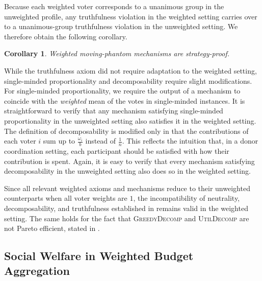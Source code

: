 \documentclass[11pt]{article}
\newcommand{\GrdDec}{\textsc{GreedyDecomp} }
\newcommand{\UtDec}{\textsc{UtilDecomp} }
\newtheorem{corollary}{Corollary}
\begin{document}
Because each weighted voter corresponds to a unanimous group in the unweighted profile, any truthfulness violation in the weighted setting carries over to a unanimous-group truthfulness violation in the unweighted setting. We therefore obtain the following corollary.

\begin{corollary}
    Weighted moving-phantom mechanisms are strategy-proof.
\end{corollary}


While the truthfulness axiom did not require adaptation to the weighted setting, single-minded proportionality and decomposability require slight modifications.
For single-minded proportionality, we require the output of a mechanism to coincide with the \textit{weighted} mean of the votes in single-minded instances. It is straightforward to verify that any mechanism satisfying single-minded proportionality in the unweighted setting also satisfies it in the weighted setting. 
The definition of decomposability is modified only in that the contributions of each voter $i$ sum up to $\frac{\omega_i}{b}$ instead of $\frac{1}{n}$. This reflects the intuition that, in a donor coordination setting, each participant should be satisfied with how their contribution is spent. Again, it is easy to verify that every mechanism satisfying decomposability in the unweighted setting also does so in the weighted setting.

Since all relevant weighted axioms and mechanisms reduce to their unweighted counterparts when all voter weights are $1$, the incompatibility of neutrality, decomposability, and truthfulness established in  remains valid in the weighted setting. The same holds for the fact that \GrdDec and \UtDec are not Pareto efficient, stated in .


\subsection{Social Welfare in Weighted Budget Aggregation}
\end{document}
